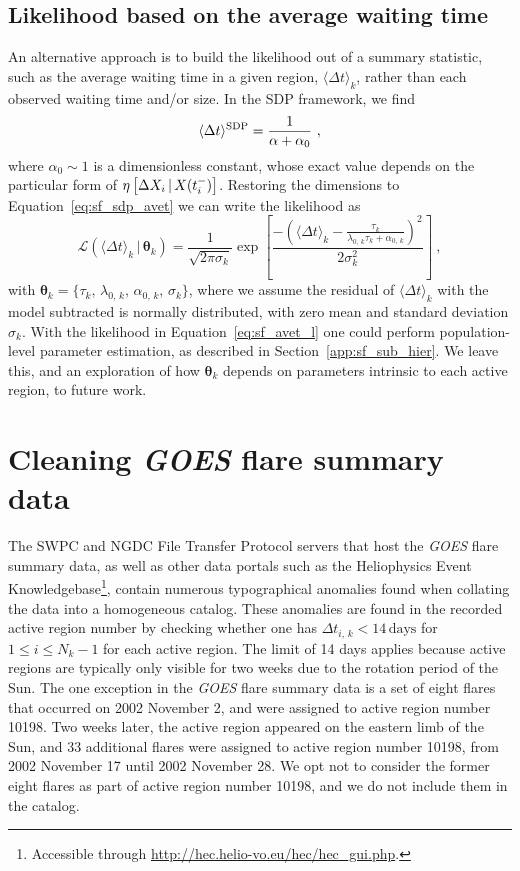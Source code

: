 \begin{subappendices}
\subsection{Likelihood based on the average waiting time} \label{app:sf_avet}
An alternative approach is to build the likelihood out of a summary statistic, such as the average waiting time in a given region, $\langle \Delta t \rangle_k$, rather than each observed waiting time and/or size. In the SDP framework, we find  \citep{Fulgenzi2017, Millhouse2022}
\begin{equation}
\langle \Delta t \rangle^{\rm SDP} = \frac{1}{\alpha + \alpha_0}\ , \label{eq:sf_sdp_avet}
\end{equation}
where $\alpha_0 \sim 1$ is a dimensionless constant, whose exact value depends on the particular form of $\eta\left[\Delta X_{i}\,|\,X(t_i^-)\right]$. Restoring the dimensions to Equation~\eqref{eq:sf_sdp_avet} we can write the likelihood as
\begin{equation}
\mathcal{L}\left(\langle \Delta t \rangle_k\,|\, \boldsymbol{\theta}_k\right) = \frac{1}{\sqrt{2\pi\sigma_k}} \exp\left[\frac{-\left(\langle \Delta t \rangle_k - \frac{\tau_k}{\lambda_{0,\,k} \tau_k + \alpha_{0,\,k}}\right)^2}{2\sigma_k^2} \right]\ , \label{eq:sf_avet_l}
\end{equation}
with $\boldsymbol{\theta}_k = \{\tau_k,\, \lambda_{0,\,k},\, \alpha_{0,\,k},\, \sigma_k\}$, where we assume the residual of $\langle \Delta t \rangle_k$ with the model subtracted is normally distributed, with zero mean and standard deviation $\sigma_k$. With the likelihood in Equation~\eqref{eq:sf_avet_l} one could perform population-level parameter estimation, as described in Section~\ref{app:sf_sub_hier}. We leave this, and an exploration of how $\boldsymbol{\theta}_k$ depends on parameters intrinsic to each active region, to future work.

\section{Cleaning \emph{GOES} flare summary data} \label{app:sf_cleaning}
The SWPC and NGDC File Transfer Protocol servers that host the \emph{GOES} flare summary data, as well as other data portals such as the Heliophysics Event Knowledgebase\footnote{Accessible through \url{http://hec.helio-vo.eu/hec/hec_gui.php}.}, contain numerous typographical anomalies found when collating the data into a homogeneous catalog. These anomalies are found in the recorded active region number by checking whether one has $\Delta t_{i,\,k} < 14\,\textrm{days}$ for $1 \leq i \leq N_k - 1$ for each active region. The limit of 14 days applies because active regions are typically only visible for two weeks due to the rotation period of the Sun. The one exception in the \emph{GOES} flare summary data is a set of eight flares that occurred on 2002 November 2, and were assigned to active region number 10198. Two weeks later, the active region appeared on the eastern limb of the Sun, and 33 additional flares were assigned to active region number 10198, from 2002 November 17 until 2002 November 28. We opt not to consider the former eight flares as part of active region number 10198, and we do not include them in the catalog.


\end{subappendices}
